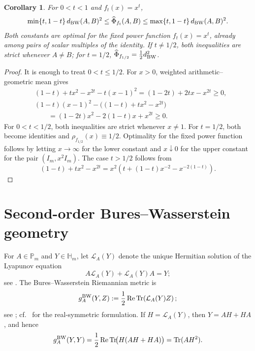 \documentclass[11pt]{amsart}
\newtheorem{corollary}[theorem]{Corollary}
\theoremstyle{definition}
\theoremstyle{remark}
\newcommand{\Pm}{\mathbb P_m}
\newcommand{\Hm}{\mathbb H_m}
\newcommand{\Tr}{\operatorname{Tr}}
\newcommand{\altPhi}{\widehat{\Phi}}
\begin{document}
	\begin{corollary}
		\label{cor:power-sharp-comparison}
		For $0<t<1$ and $f_t(x)=x^t$,
		\begin{equation}\label{eq:power-sharp-comparison}
			\min\{t,1-t\}\,d_{\rm BW}(A,B)^2
			\le \altPhi_{f_t}(A,B)
			\le \max\{t,1-t\}\,d_{\rm BW}(A,B)^2.
		\end{equation}
Both constants are optimal for the fixed power function $f_t(x)=x^t$,
	already among pairs of scalar multiples of the identity.   If $t\ne1/2$, both inequalities are
		strict whenever $A\ne B$; for $t=1/2$,
		$\altPhi_{f_{1/2}}=\tfrac12d_{\rm BW}^2$.
	\end{corollary}
	
	\begin{proof}
		It is enough to treat $0<t\le1/2$.  For $x>0$, weighted
		arithmetic--geometric mean gives
		\begin{align*}
			&(1-t)+tx^2-x^{2t}-t(x-1)^2
			=(1-2t)+2tx-x^{2t}\ge0,\\
			&(1-t)(x-1)^2-\bigl((1-t)+tx^2-x^{2t}\bigr)\\
			&\qquad=(1-2t)x^2-2(1-t)x+x^{2t}\ge0.
		\end{align*}
		For $0<t<1/2$, both inequalities are strict whenever $x\ne1$.
		For $t=1/2$, both become identities and
		$\rho_{f_{1/2}}(x)\equiv1/2$.  Optimality for the fixed power function follows by letting
		$x\to\infty$ for the lower constant and $x\downarrow0$ for the upper
		constant for the pair $(I_m,x^2I_m)$.  The case $t>1/2$ follows from
		\[
		(1-t)+tx^2-x^{2t}
		=x^2\left(t+(1-t)x^{-2}-x^{-2(1-t)}\right).
		\]
	\end{proof}
	
 
\section{Second-order Bures--Wasserstein geometry}
\label{sec:hessian}
	
For \(A\in\Pm\) and \(Y\in\Hm\), let \(\mathcal L_A(Y)\) denote the
unique Hermitian solution of the Lyapunov equation
\[
A\mathcal L_A(Y)+\mathcal L_A(Y)A=Y;
\]
see \cite[Section~4, Eqs.~(30)--(31)]{BhatiaJainLim2019}.
The Bures--Wasserstein Riemannian metric is
\begin{equation}\label{eq:bw-metric}
	g_A^{\rm BW}(Y,Z)
	:=\frac12\operatorname{Re}\Tr\!\left(\mathcal L_A(Y)Z\right);
\end{equation}
see \cite[Section~4, Eqs.~(29)--(32) and Theorem~5]
{BhatiaJainLim2019}; cf.\
\cite[Section~4, Propositions~6--7]{MalagoMontrucchioPistone2018}
for the real-symmetric formulation. If \(H=\mathcal L_A(Y)\), then
\(Y=AH+HA\), and hence
\begin{equation}\label{eq:bw-metric-diagonal}
	g_A^{\rm BW}(Y,Y)
	=\frac12\operatorname{Re}\Tr\!\bigl(H(AH+HA)\bigr)
	=\Tr(AH^2).
\end{equation}
	
\end{document}
